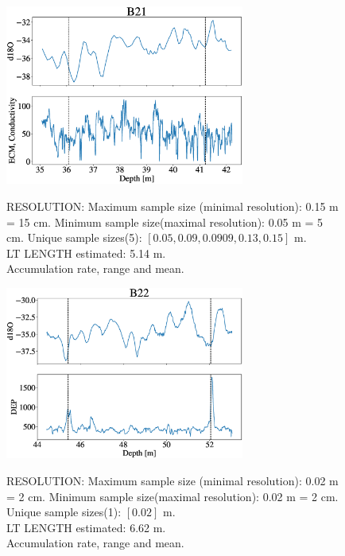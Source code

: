 \documentclass[11pt]{article}
\begin{document}
\begin{figure}[h]
	\centering
	\includegraphics[width=0.7\textwidth]{Core_LT_B21.eps}
	\label{fig:B21}
	\caption{RESOLUTION: Maximum sample size (minimal resolution): 0.15 m = 15 cm. Minimum sample size(maximal resolution): 0.05 m = 5 cm. Unique sample sizes(5): $[0.05, 0.09, 0.0909, 0.13, 0.15]$ m.\\
		LT LENGTH estimated: 5.14 m.\\
		Accumulation rate, range and mean.}
\end{figure}

\begin{figure}[h]
	\centering
	\includegraphics[width=0.7\textwidth]{Core_LT_B22.eps}
	\label{fig:B22}
	\caption{RESOLUTION: Maximum sample size (minimal resolution): 0.02 m = 2 cm. Minimum sample size(maximal resolution): 0.02 m = 2 cm. Unique sample sizes(1): $[0.02]$ m.\\
		LT LENGTH estimated: 6.62 m.\\
		Accumulation rate, range and mean.}	
\end{figure}
\end{document}

